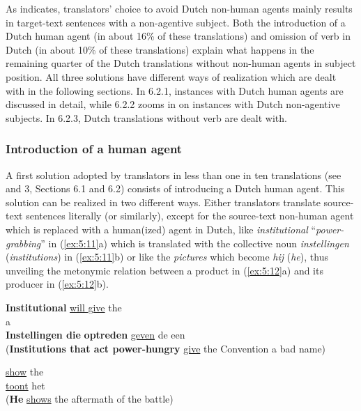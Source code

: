 \documentclass[output=paper]{LSP/langsci}
\begin{document}
As  indicates, translators’ choice to avoid Dutch non-human agents mainly results in target-text sentences with a non-agentive subject. Both the introduction of a Dutch human agent (in about 16\% of these translations) and omission of verb in Dutch (in about 10\% of these translations) explain what happens in the remaining quarter of the Dutch translations without non-human agents in subject position. All three solutions have different ways of realization which are dealt with in the following sections. In 6.2.1, instances with Dutch human agents are discussed in detail, while 6.2.2 zooms in on instances with Dutch non-agentive subjects. In 6.2.3, Dutch translations without verb are dealt with.  

\subsubsection{Introduction of a human agent}

A first solution adopted by translators in less than one in ten translations (see  and 3, Sections 6.1 and 6.2) consists of introducing a Dutch human agent. This solution can be realized in two different ways. Either translators translate source-text sentences literally (or similarly), except for the source-text non-human agent which is replaced with a human(ized) agent in Dutch, like \textit{institutional} “\textit{power-grabbing}” in (\ref{ex:5:11}a) which is translated with the collective noun \textit{instellingen} (\textit{institutions}) in (\ref{ex:5:11}b) or like the \textit{pictures} which become \textit{hij} (\textit{he}), thus unveiling the metonymic relation between a product in (\ref{ex:5:12}a) and its producer in (\ref{ex:5:12}b).  

\ea \label{ex:5:11}
\ea \textbf{Institutional}  \ul{will give} the \\ a \\[1em]
\ex \textbf{Instellingen die}  \textbf{optreden} \ul{geven} de  een \\
(\textbf{Institutions that act power-hungry} \ul{give} the Convention a bad name)
\z
\z


\ea \label{ex:5:12}
\ea
{} \ul{show} the \\[1em]
\ex {} \ul{toont} het \\
(\textbf{He} \ul{shows} the aftermath of the battle)
\z
\z
{}
\end{document}
